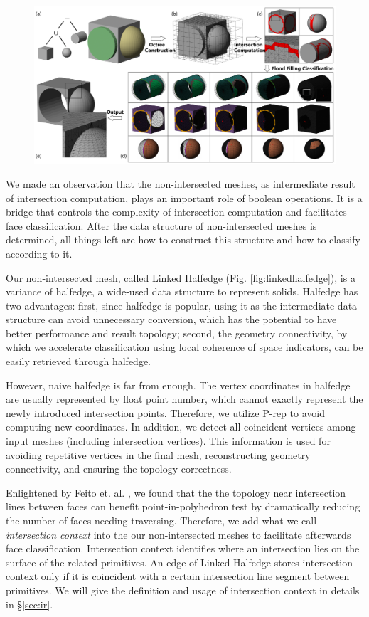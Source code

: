 \documentclass[10pt,journal,compsoc]{IEEEtran}
\begin{document}
\begin{figure}[!t]
\centering
\includegraphics[width=7.1in]{flowchart}
\caption{{\color{red}{Sketch: overview, will be replaced}}}
\label{fig:overview}
\end{figure}


\label{sec:meshes}
We made an observation that the non-intersected meshes, as intermediate result of intersection computation, plays an important role of boolean operations. It is a bridge that controls the complexity of intersection computation and facilitates face classification. After the data structure of non-intersected meshes is determined, all things left are how to construct this structure and how to classify according to it.

Our non-intersected mesh, called Linked Halfedge (Fig. \ref{fig:linkedhalfedge}), is a variance of halfedge, a wide-used data structure to represent solids. Halfedge has two advantages: first, since halfedge is popular, using it as the intermediate data structure can avoid unnecessary conversion, which has the potential to have better performance and result topology; second, the geometry connectivity, by which we accelerate classification using local coherence of space indicators, can be easily retrieved through halfedge.

However, naive halfedge is far from enough. The vertex coordinates in halfedge are usually represented by float point number, which cannot exactly represent the newly introduced intersection points. Therefore, we utilize P-rep to avoid computing new coordinates. In addition, we detect all coincident vertices among input meshes (including intersection vertices). This information is used for avoiding repetitive vertices in the final mesh, reconstructing geometry connectivity, and ensuring the topology correctness.

Enlightened by Feito et. al. \cite{feito2013fast}, we found that the the topology near intersection lines between faces can benefit point-in-polyhedron test by dramatically reducing the number of faces needing traversing. Therefore, we add what we call \emph{intersection context} into the our non-intersected meshes to facilitate afterwards face classification. Intersection context identifies where an intersection lies on the surface of the related primitives. An edge of Linked Halfedge stores intersection context only if it is coincident with a certain intersection line segment between primitives. We will give the definition and usage of intersection context in details in \S\ref{sec:ir}.
\end{document}
